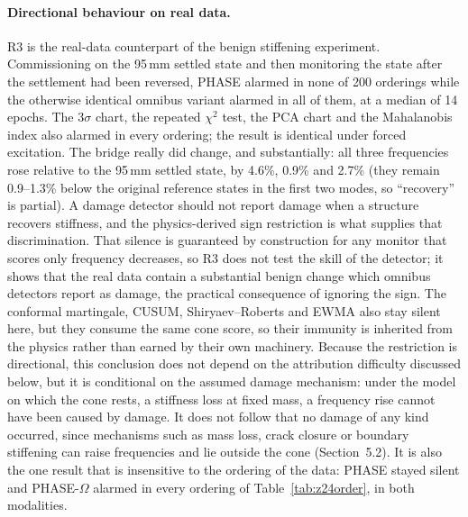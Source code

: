 \documentclass[12pt,a4paper]{article}
\newcommand{\rev}[1]{#1}
\newcommand{\rev}[1]{{\color{revcol}#1}}
\begin{document}
\paragraph{Directional behaviour on real data.} R3 is the real-data counterpart of the benign stiffening experiment. Commissioning on the 95\,mm settled state and then monitoring the state after the settlement had been reversed, PHASE alarmed in none of 200 orderings while the otherwise identical omnibus variant alarmed in all of them, at a median of 14 epochs. The $3\sigma$ chart, the repeated $\chi^2$ test, the PCA chart and the Mahalanobis index also alarmed in every ordering; the result is identical under forced excitation. The bridge really did change, and substantially: all three frequencies rose relative to the 95\,mm settled state, by 4.6\%, 0.9\% and 2.7\% (they remain 0.9--1.3\% below the original reference states in the first two modes, so ``recovery'' is partial). A damage detector should not report damage when a structure recovers stiffness, and the physics-derived sign restriction is what supplies that discrimination. \rev{That silence is guaranteed by construction for any monitor that scores only frequency decreases, so R3 does not test the skill of the detector; it shows that the real data contain a substantial benign change which omnibus detectors report as damage, the practical consequence of ignoring the sign.} The conformal martingale, CUSUM, Shiryaev--Roberts and EWMA also stay silent here, but they consume the same cone score, so their immunity is inherited from the physics rather than earned by their own machinery. \color{revcolb}\rev{Because the restriction is directional, this conclusion does not depend on the attribution difficulty discussed below, but it is conditional on the assumed damage mechanism: under the model on which the cone rests, a stiffness loss at fixed mass, a frequency rise cannot have been caused by damage.\color{revcol} \color{revcolb}It does not follow that no damage of any kind occurred, since mechanisms such as mass loss, crack closure or boundary stiffening can raise frequencies and lie outside the cone (Section~5.2).} \rev{It is also the one result that is insensitive to the ordering of the data: PHASE stayed silent and PHASE-$\Omega$ alarmed in every ordering of Table~\ref{tab:z24order}, in both modalities.}\color{black}
\end{document}
